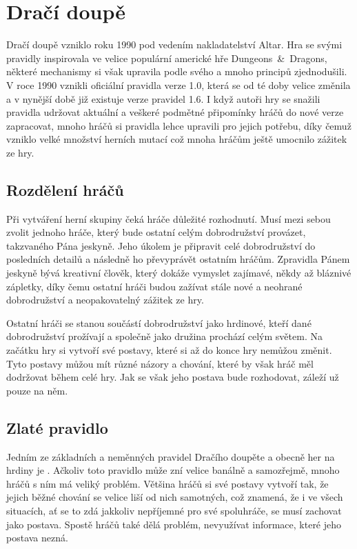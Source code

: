 \documentclass[thesis=B,czech]{resources/FITthesis}[2012/06/26]
\begin{document}
	\section{Dračí doupě}
	Dračí doupě vzniklo roku 1990 pod vedením nakladatelství Altar. Hra se svými pravidly inspirovala ve velice populární americké hře Dungeons~\&~Dragons, některé mechanismy si však upravila podle svého a mnoho principů zjednodušili. V roce 1990 vznikli oficiální pravidla verze 1.0, která se od té doby velice změnila a v nynější době již existuje verze pravidel 1.6. I když autoři hry se snažili pravidla udržovat aktuální a veškeré podmětné připomínky hráčů do nové verze zapracovat, mnoho hráčů si pravidla lehce upravili pro jejich potřebu, díky čemuž vzniklo velké množství herních mutací což mnoha hráčům ještě umocnilo zážitek ze hry. 
	\subsection{Rozdělení hráčů}
Při vytváření herní skupiny čeká hráče důležité rozhodnutí. Musí mezi sebou zvolit jednoho hráče, který bude ostatní celým dobrodružství provázet, takzvaného Pána jeskyně. Jeho úkolem je připravit celé dobrodružství do posledních detailů a následně ho převyprávět ostatním hráčům. Zpravidla Pánem jeskyně bývá kreativní člověk, který dokáže vymyslet zajímavé, někdy až bláznivé zápletky, díky čemu ostatní hráči budou zažívat stále nové a neohrané dobrodružství a neopakovatelný zážitek ze hry. \par

Ostatní hráči se stanou součástí dobrodružství jako hrdinové, kteří dané dobrodružství prožívají a společně jako družina prochází celým světem. Na začátku hry si vytvoří své postavy, které si až do konce hry nemůžou změnit. Tyto postavy můžou mít různé názory a chování, které by však hráč měl dodržovat během celé hry. Jak se však jeho postava bude rozhodovat, záleží už pouze na něm.


	\subsection{Zlaté pravidlo}
Jedním ze základních a neměnných pravidel Dračího doupěte a obecně her na hrdiny je . Ačkoliv toto pravidlo může zní velice banálně a samozřejmě, mnoho hráčů s ním má veliký problém. Většina hráčů si své postavy vytvoří tak, že jejich běžné chování se velice liší od nich samotných, což znamená, že i ve všech situacích, ať se to zdá jakkoliv nepříjemné pro své spoluhráče, se musí zachovat jako postava. Spostě hráčů také dělá problém, nevyužívat informace, které jeho postava nezná. \par
\end{document}
